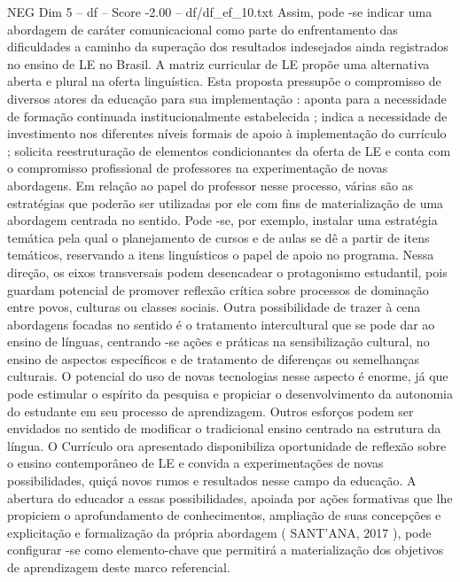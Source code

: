 \begin{textsample}{NEG Dim 5 – df – Score -2.00 – df/df\_ef\_10.txt}
Assim, pode -se indicar uma abordagem de caráter comunicacional como parte do enfrentamento das dificuldades a caminho da superação dos resultados indesejados ainda registrados no ensino de LE no Brasil.
A matriz curricular de LE propõe uma alternativa aberta e plural na oferta linguística.
Esta proposta pressupõe o compromisso de diversos atores da educação para sua implementação : aponta para a necessidade de formação continuada institucionalmente estabelecida ; indica a necessidade de investimento nos diferentes níveis formais de apoio à implementação do currículo ; solicita reestruturação de elementos condicionantes da oferta de LE e conta com o compromisso profissional de professores na experimentação de novas abordagens.
Em relação ao papel do professor nesse processo, várias são as estratégias que poderão ser utilizadas por ele com fins de materialização de uma abordagem centrada no sentido.
Pode -se, por exemplo, instalar uma estratégia temática pela qual o planejamento de cursos e de aulas se dê a partir de itens temáticos, reservando a itens linguísticos o papel de apoio no programa.
Nessa direção, os eixos transversais podem desencadear o protagonismo estudantil, pois guardam potencial de promover reflexão crítica sobre processos de dominação entre povos, culturas ou classes sociais.
Outra possibilidade de trazer à cena abordagens focadas no sentido é o tratamento intercultural que se pode dar ao ensino de línguas, centrando -se ações e práticas na sensibilização cultural, no ensino de aspectos específicos e de tratamento de diferenças ou semelhanças culturais.
O potencial do uso de novas tecnologias nesse aspecto é enorme, já que pode estimular o espírito da pesquisa e propiciar o desenvolvimento da autonomia do estudante em seu processo de aprendizagem.
Outros esforços podem ser envidados no sentido de modificar o tradicional ensino centrado na estrutura da língua.
O Currículo ora apresentado disponibiliza oportunidade de reflexão sobre o ensino contemporâneo de LE e convida a experimentações de novas possibilidades, quiçá novos rumos e resultados nesse campo da educação.
A abertura do educador a essas possibilidades, apoiada por ações formativas que lhe propiciem o aprofundamento de conhecimentos, ampliação de suas concepções e explicitação e formalização da própria abordagem ( SANT’ANA, 2017 ), pode configurar -se como elemento-chave que permitirá a materialização dos objetivos de aprendizagem deste marco referencial.

\end{textsample}
